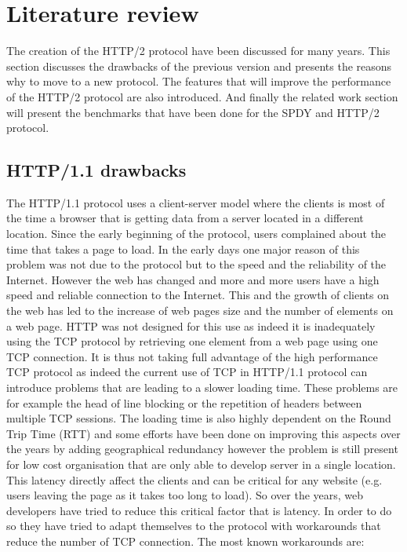 \section{Literature review}
\label{relwork}
The creation of the HTTP/2 protocol have been discussed for many years. This section discusses the drawbacks of the previous version and presents the reasons why to move to a new protocol. The features that will improve the performance of the HTTP/2 protocol are also introduced. And finally the related work section will present the benchmarks that have been done for the SPDY and HTTP/2 protocol.

\subsection{HTTP/1.1 drawbacks}
The HTTP/1.1 protocol uses a client-server model where the clients is most of the time a browser that is getting data from a server located in a different location. Since the early beginning of the protocol, users complained about the time that takes a page to load. In the early days one major reason of this problem was not due to the protocol but to the speed and the reliability of the Internet. However the web has changed and more and more users have a high speed and reliable connection to the Internet. This and the growth of clients on the web has led to the increase of web pages size and the number of elements on a web page. HTTP was not designed for this use as indeed it is inadequately using the TCP protocol by retrieving one element from a web page using one TCP connection. It is thus not taking full advantage of the high performance TCP protocol as indeed the current use of TCP in HTTP/1.1 protocol can introduce problems that are leading to a slower loading time. These problems are for example the head of line blocking or the repetition of headers between multiple TCP sessions. The loading time is also highly dependent on the Round Trip Time (RTT) and some efforts have been done on improving this aspects over the years by adding geographical redundancy however the problem is still present for low cost organisation that are only able to develop server in a single location. 
This latency directly affect the clients and can be critical for any website (e.g. users leaving the page as it takes too long to load). So over the years, web developers have tried to reduce this critical factor that is latency. In order to do so they have tried to adapt themselves to the protocol with workarounds that reduce the number of TCP connection. The most known workarounds are:
